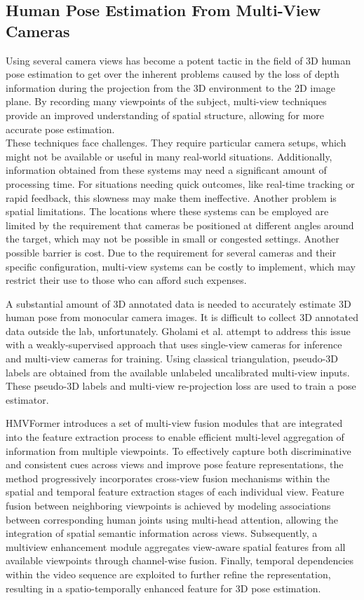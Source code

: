 \subsection{Human Pose Estimation From Multi-View Cameras}
Using several camera views has become a potent tactic in the field of 3D human pose estimation to get over the inherent problems caused by the loss of depth information during the projection from the 3D environment to the 2D image 
plane. By recording many viewpoints of the subject, multi-view techniques provide an improved understanding of spatial structure, allowing for more accurate pose estimation.\\
These techniques face challenges. They require particular camera setups, which might not be available or useful in many real-world situations. Additionally, information obtained from these systems may need a significant amount of 
processing time. For situations needing quick outcomes, like real-time tracking or rapid feedback, this slowness may make them ineffective. Another problem is spatial limitations. The locations where these systems can be employed are 
limited by the requirement that cameras be positioned at different angles around the target, which may not be possible in small or congested settings. Another possible barrier is cost. Due to the requirement for several cameras and 
their specific configuration, multi-view systems can be costly to implement, which may restrict their use to those who can afford such expenses.

A substantial amount of 3D annotated data is needed to accurately estimate 3D human pose from monocular camera images. It is difficult to collect 3D annotated data outside the lab, unfortunately. Gholami et al. \cite{gholami2022self}
attempt to address this issue with a weakly-supervised approach that uses single-view cameras for inference and multi-view cameras for training. Using classical triangulation, pseudo-3D labels are obtained from the available unlabeled 
uncalibrated multi-view inputs. These pseudo-3D labels and multi-view re-projection loss are used to train a pose estimator.

HMVFormer \cite{zhou2023efficient} introduces a set of multi-view fusion modules that are integrated into the feature extraction process to enable efficient multi-level aggregation of information from multiple viewpoints. To 
effectively capture both discriminative and consistent cues across views and improve pose feature representations, the method progressively incorporates cross-view fusion mechanisms within the spatial and temporal feature extraction 
stages of each individual view. Feature fusion between neighboring viewpoints is achieved by modeling associations between corresponding human joints using multi-head attention, allowing the integration of spatial semantic information 
across views. Subsequently, a multiview enhancement module aggregates view-aware spatial features from all available viewpoints through channel-wise fusion. Finally, temporal dependencies within the video sequence are exploited to 
further refine the representation, resulting in a spatio-temporally enhanced feature for 3D pose estimation.


